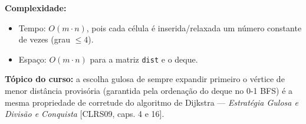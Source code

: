 \textbf{Complexidade:}
\begin{itemize}
    \item Tempo: $O(m \cdot n)$, pois cada célula é inserida/relaxada um
    número constante de vezes (grau $\leq 4$).
    \item Espaço: $O(m \cdot n)$ para a matriz \texttt{dist} e o deque.
\end{itemize}

\textbf{Tópico do curso:} a escolha gulosa de sempre expandir primeiro o
vértice de menor distância provisória (garantida pela ordenação do deque no
0-1 BFS) é a mesma propriedade de corretude do algoritmo de Dijkstra ---
\emph{Estratégia Gulosa e Divisão e Conquista} [CLRS09, caps. 4 e 16].
